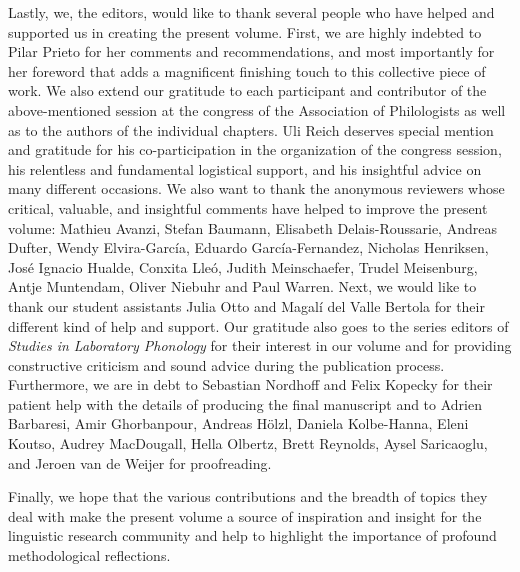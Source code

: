 \documentclass[output=paper]{langsci/langscibook}
\begin{document}
\largerpage Lastly, we, the editors, would like to thank several people who have helped and supported us in creating the present volume. First, we are highly indebted to Pilar Prieto for her comments and recommendations, and most importantly for her foreword that adds a magnificent finishing touch to this collective piece of work. We also extend our gratitude to each participant and contributor of the above-mentioned session at the congress of the  Association of  Philologists as well as to the authors of the individual chapters. Uli Reich deserves special mention and gratitude for his co-participation in the organization of the congress session, his relentless and fundamental logistical support, and his insightful advice on many different occasions. We also want to thank the anonymous reviewers whose critical, valuable, and insightful comments have helped to improve the present volume: Mathieu Avanzi, Stefan Baumann, Elisabeth Delais-Roussarie, Andreas Dufter, Wendy Elvira-García, Eduardo García-Fernandez, Nicholas Henriksen, José Ignacio Hualde, Conxita Lleó, Judith Meinschaefer, Trudel Meisenburg, Antje Muntendam, Oliver Niebuhr and Paul Warren. Next, we would like to thank our student assistants Julia Otto and Magalí del Valle Bertola for their different kind of help and support. Our gratitude also goes to the series editors of \textit{Studies in Laboratory Phonology} for their interest in our volume and for providing constructive criticism and sound advice during the publication process. Furthermore, we are in debt to Sebastian Nordhoff and Felix Kopecky for their patient help with the details of producing the final manuscript and to Adrien Barbaresi, Amir Ghorbanpour, Andreas Hölzl, Daniela Kolbe-Hanna, Eleni Koutso, Audrey MacDougall, Hella Olbertz, Brett Reynolds, Aysel Saricaoglu, and Jeroen van de Weijer for proofreading. 

\largerpage
Finally, we hope that the various contributions and the breadth of topics they deal with make the present volume a source of inspiration and insight for the linguistic research community and help to highlight the importance of profound methodological reflections. 

{\sloppy
\printbibliography[heading=subbibliography,notkeyword=this]
}
\end{document}

